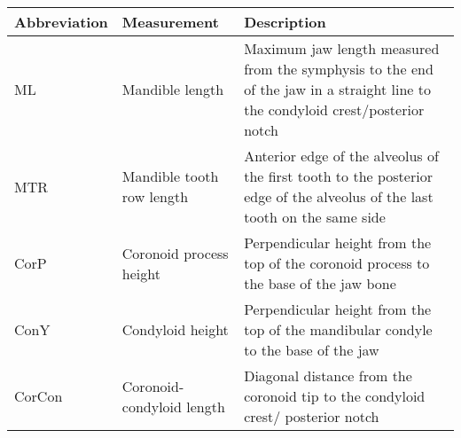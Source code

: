 
\begin{tabular}{p{2.5cm}p{3.2cm}p{9cm}}
\hline
\textbf{Abbreviation} & \textbf{Measurement} & \textbf{Description}\\
\hline
ML & Mandible length & Maximum jaw length measured from the symphysis to the end of the jaw in a straight line to the condyloid crest/posterior notch\\
MTR & Mandible tooth row length & Anterior edge of the alveolus of the first tooth to the posterior edge of the alveolus of the last tooth on the same side\\
CorP & Coronoid process height & Perpendicular height from the top of the coronoid process to the base of the jaw bone\\
ConY & Condyloid height & Perpendicular height from the top of the mandibular condyle to the base of the jaw\\
CorCon & Coronoid-condyloid length & Diagonal distance from the coronoid tip to the condyloid crest/ posterior notch \citep{Carraway1996}\\
\hline
\end{tabular}